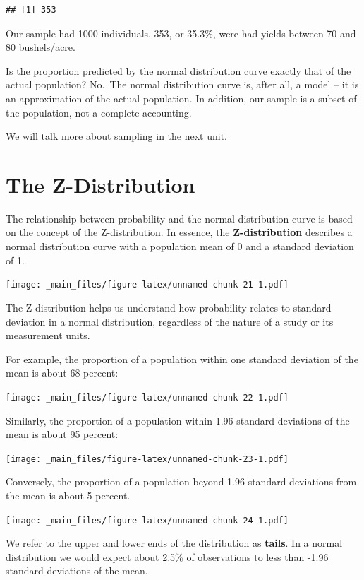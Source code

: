 \documentclass[
]{book}
\begin{document}
\begin{verbatim}
## [1] 353
\end{verbatim}

Our sample had 1000 individuals. 353, or 35.3\%, were had yields between 70 and 80 bushels/acre.

Is the proportion predicted by the normal distribution curve exactly that of the actual population? No.~The normal distribution curve is, after all, a model -- it is an approximation of the actual population. In addition, our sample is a subset of the population, not a complete accounting.

We will talk more about sampling in the next unit.

\hypertarget{the-z-distribution}{%
\section{The Z-Distribution}\label{the-z-distribution}}

The relationship between probability and the normal distribution curve is based on the concept of the Z-distribution. In essence, the \textbf{Z-distribution} describes a normal distribution curve with a population mean of 0 and a standard deviation of 1.

\texttt{[image: \_main\_files/figure-latex/unnamed-chunk-21-1.pdf]}

The Z-distribution helps us understand how probability relates to standard deviation in a normal distribution, regardless of the nature of a study or its measurement units.

For example, the proportion of a population within one standard deviation of the mean is about 68 percent:

\texttt{[image: \_main\_files/figure-latex/unnamed-chunk-22-1.pdf]}

Similarly, the proportion of a population within 1.96 standard deviations of the mean is about 95 percent:

\texttt{[image: \_main\_files/figure-latex/unnamed-chunk-23-1.pdf]}

Conversely, the proportion of a population beyond 1.96 standard deviations from the mean is about 5 percent.

\texttt{[image: \_main\_files/figure-latex/unnamed-chunk-24-1.pdf]}

We refer to the upper and lower ends of the distribution as \textbf{tails}. In a normal distribution we would expect about 2.5\% of observations to less than -1.96 standard deviations of the mean.
\end{document}
